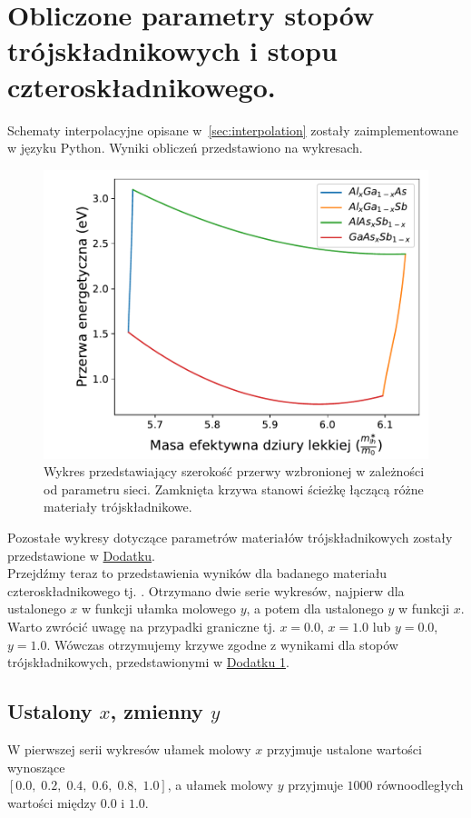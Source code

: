 \documentclass[12pt,openany,a4paper]{book}
\begin{document}
\section{Obliczone parametry stopów trójskładnikowych i stopu czteroskładnikowego.}

Schematy interpolacyjne opisane w~\ref{sec:interpolation} zostały zaimplementowane w języku Python.
Wyniki obliczeń przedstawiono na wykresach.\\

\begin{figure}[H]
	\centering
	\includegraphics[width = 0.8\linewidth]{Figures/ternary/Eg_alc.pdf}
	\caption{Wykres przedstawiający szerokość przerwy wzbronionej w zależności od parametru sieci.
	Zamknięta krzywa stanowi ścieżkę łączącą różne materiały trójskładnikowe.}\label{fig:Eg_alc}
\end{figure}
\pagebreak
Pozostałe wykresy dotyczące parametrów materiałów trójskładnikowych zostały przedstawione w \hyperref[chapt:dodatek]{Dodatku}.\\

Przejdźmy teraz to przedstawienia wyników dla badanego materiału 
czteroskładnikowego tj. . 
Otrzymano dwie serie wykresów, najpierw dla ustalonego \(x\) w funkcji ułamka
molowego \(y\), a potem dla ustalonego \(y\) w funkcji \(x\). Warto zwrócić uwagę
na przypadki graniczne tj. \(x = 0.0\), \(x =  1.0\) lub \(y = 0.0\), \(y =  1.0\). Wówczas otrzymujemy
krzywe zgodne z wynikami dla stopów trójskładnikowych, przedstawionymi w \hyperref[chapt:dodatek]{Dodatku 1}.

\subsection{Ustalony \(x\), zmienny \(y\)}
W pierwszej serii wykresów ułamek molowy \(x\) przyjmuje ustalone
wartości wynoszące\\
 \([0.0,\;0.2,\; 0.4,\; 0.6,\; 0.8,\; 1.0]\), a ułamek molowy \(y\)
przyjmuje \(1000\) równoodległych wartości między \(0.0\) i \(1.0\).
\end{document}
